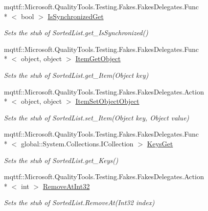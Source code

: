 \begin{DoxyCompactItemize}
mqttf\-::\-Microsoft.\-Quality\-Tools.\-Testing.\-Fakes.\-Fakes\-Delegates.\-Func\\*
$<$ bool $>$ \hyperlink{class_system_1_1_collections_1_1_fakes_1_1_stub_sorted_list_a4693c05f75f898d44ceaee0595b10485}{Is\-Synchronized\-Get}
\begin{DoxyCompactList}\small\item\em Sets the stub of Sorted\-List.\-get\-\_\-\-Is\-Synchronized()\end{DoxyCompactList}\item 
mqttf\-::\-Microsoft.\-Quality\-Tools.\-Testing.\-Fakes.\-Fakes\-Delegates.\-Func\\*
$<$ object, object $>$ \hyperlink{class_system_1_1_collections_1_1_fakes_1_1_stub_sorted_list_af6e2a083fa336d256a816df1785a29fa}{Item\-Get\-Object}
\begin{DoxyCompactList}\small\item\em Sets the stub of Sorted\-List.\-get\-\_\-\-Item(\-Object key)\end{DoxyCompactList}\item 
mqttf\-::\-Microsoft.\-Quality\-Tools.\-Testing.\-Fakes.\-Fakes\-Delegates.\-Action\\*
$<$ object, object $>$ \hyperlink{class_system_1_1_collections_1_1_fakes_1_1_stub_sorted_list_a81b386fab02b36c80cb26da809aa886a}{Item\-Set\-Object\-Object}
\begin{DoxyCompactList}\small\item\em Sets the stub of Sorted\-List.\-set\-\_\-\-Item(\-Object key, Object value)\end{DoxyCompactList}\item 
mqttf\-::\-Microsoft.\-Quality\-Tools.\-Testing.\-Fakes.\-Fakes\-Delegates.\-Func\\*
$<$ global\-::\-System.\-Collections.\-I\-Collection $>$ \hyperlink{class_system_1_1_collections_1_1_fakes_1_1_stub_sorted_list_a7d6851d1111a95498153f020cf72999b}{Keys\-Get}
\begin{DoxyCompactList}\small\item\em Sets the stub of Sorted\-List.\-get\-\_\-\-Keys()\end{DoxyCompactList}\item 
mqttf\-::\-Microsoft.\-Quality\-Tools.\-Testing.\-Fakes.\-Fakes\-Delegates.\-Action\\*
$<$ int $>$ \hyperlink{class_system_1_1_collections_1_1_fakes_1_1_stub_sorted_list_a505f88c0b4420324915cfdbc535c6154}{Remove\-At\-Int32}
\begin{DoxyCompactList}\small\item\em Sets the stub of Sorted\-List.\-Remove\-At(\-Int32 index)\end{DoxyCompactList}\item 

\end{DoxyCompactItemize}
